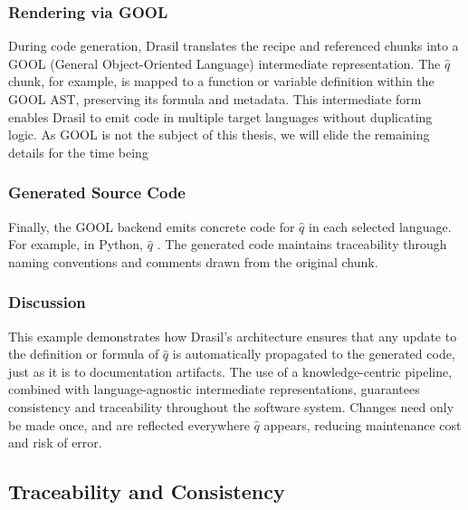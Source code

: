 \subsubsection{Rendering via GOOL}

During code generation, Drasil translates the recipe and referenced chunks into 
a GOOL (General Object-Oriented Language) intermediate representation. The 
$\hat{q}$ chunk, for example, is mapped to a function or variable definition 
within the GOOL AST, preserving its formula and metadata. This intermediate 
form enables Drasil to emit code in multiple target languages without 
duplicating logic. As GOOL is not the subject of this thesis, we will elide the 
remaining details for the time being 

\subsubsection{Generated Source Code}

Finally, the GOOL backend emits concrete code for $\hat{q}$ in each selected 
language. For example, in Python, $\hat{q}$ . The generated code maintains traceability 
through naming conventions and comments drawn from the original chunk.


\subsubsection{Discussion}

This example demonstrates how Drasil’s architecture ensures that any update to 
the definition or formula of $\hat{q}$ is automatically propagated to the 
generated code, just as it is to documentation artifacts. The use of a 
knowledge-centric pipeline, combined with language-agnostic intermediate 
representations, guarantees consistency and traceability throughout the 
software system. Changes need only be made once, and are reflected everywhere 
$\hat{q}$ appears, reducing maintenance cost and risk of error.


\subsection{Traceability and Consistency}

